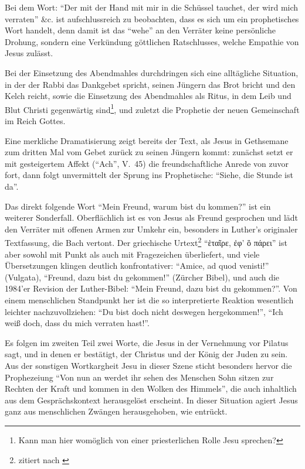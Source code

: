 \documentclass[a4paper,11pt,twoside]{scrartcl}
\begin{document}
Bei dem Wort: \enquote{Der mit der Hand mit mir in die Schüssel tauchet,
der wird mich verraten} \&c. ist aufschlussreich zu beobachten, dass es
sich um ein prophetisches Wort handelt, denn damit ist das \enquote{wehe}
an den Verräter keine persönliche Drohung, sondern eine Verkündung
göttlichen Ratschlusses, welche Empathie von Jesus zulässt.

Bei der Einsetzung des Abendmahles durchdringen sich eine alltägliche
Situation, in der der Rabbi das Dankgebet spricht, seinen Jüngern das
Brot bricht und den Kelch reicht, sowie die Einsetzung des Abendmahles
als Ritus, in dem Leib und Blut Christi gegenwärtig sind\footnote{Kann
man hier womöglich von einer priesterlichen Rolle Jesu sprechen?}, und
zuletzt die Prophetie der neuen Gemeinschaft im Reich Gottes.

Eine merkliche Dramatisierung zeigt bereits der Text, als Jesus in
Gethsemane zum dritten Mal vom Gebet zurück zu seinen Jüngern kommt:
zunächst setzt er mit gesteigertem Affekt (\enquote{Ach}, V.~45) die
freundschaftliche Anrede von zuvor fort, dann folgt unvermittelt der
Sprung ins Prophetische: \enquote{Siehe, die Stunde ist da}.

Das direkt folgende Wort \enquote{Mein Freund, warum bist du kommen?}
ist ein weiterer Sonderfall. Oberflächlich ist es von Jesus als Freund
gesprochen und lädt den Verräter mit offenen Armen zur Umkehr ein,
besonders in Luther’s originaler Textfassung, die Bach vertont.  Der
griechische Urtext\footnote{zitiert nach \cite{nestle-aland}}
\foreignquote{greek}{ἑταῖ\-ρε, ἐφ’ ὃ πάρ\-ει} ist aber sowohl mit Punkt als
auch mit Fragezeichen überliefert, und viele Übersetzungen klingen
deutlich konfrontativer: \enquote{Amice, ad quod venisti!} (Vulgata),
\enquote{Freund, dazu bist du gekommen!} (Zürcher Bibel\cite{zuercher}),
und auch die 1984’er Revision der Luther-Bibel: \enquote{Mein Freund,
dazu bist du gekommen?}.  Von einem menschlichen Standpunkt her ist
die so interpretierte Reaktion wesentlich leichter nachzuvollziehen:
\enquote{Du bist doch nicht deswegen hergekommen!}, \enquote{Ich weiß
doch, dass du mich verraten hast!}.

Es folgen im zweiten Teil zwei Worte, die Jesus in der Vernehmung vor
Pilatus sagt, und in denen er bestätigt, der Christus und der König
der Juden zu sein.  Aus der sonstigen Wortkargheit Jesu in dieser
Szene sticht besonders hervor die Prophezeiung \enquote{Von nun an
werdet ihr sehen des Menschen Sohn sitzen zur Rechten der Kraft und
kommen in den Wolken des Himmels}, die auch inhaltlich aus dem
Gesprächskontext herausgelöst erscheint.  In dieser Situation agiert
Jesus ganz aus menschlichen Zwängen herausgehoben, wie entrückt.
\end{document}
